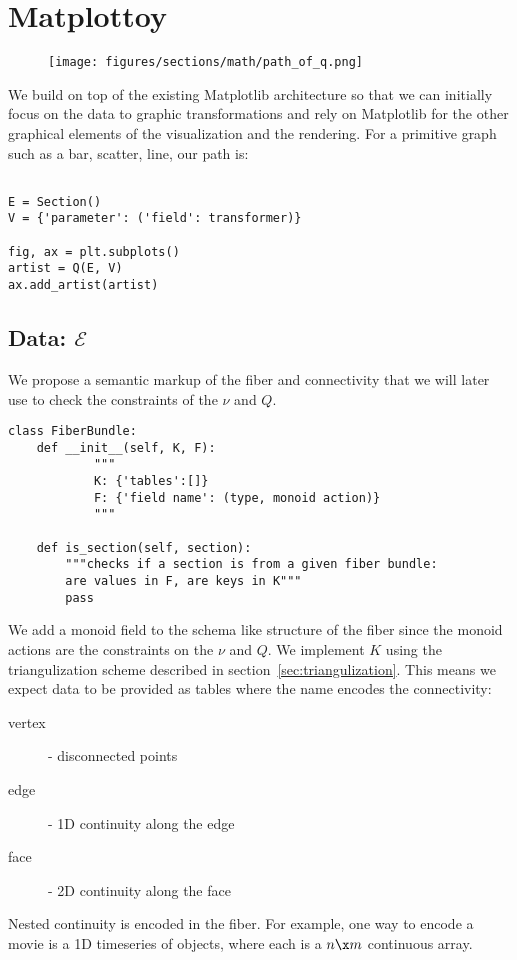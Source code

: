 \documentclass[../main.tex]{subfiles}
\begin{document}
\section{Matplottoy}
\begin{figure}
\texttt{[image: figures/sections/math/path\_of\_q.png]}
\end{figure}

We build on top of the existing Matplotlib architecture \cite{hunterMatplotlib2DGraphics2007} so that we can initially focus on the data to graphic transformations and rely on Matplotlib for the other graphical elements of the visualization and the rendering. For a primitive graph such as a bar, scatter, line, our path is: 
\begin{verbatim}

E = Section()
V = {'parameter': ('field': transformer)}

fig, ax = plt.subplots()
artist = Q(E, V)
ax.add_artist(artist)
\end{verbatim}



\subsection{Data: $\mathcal{E}$}
We propose a semantic markup of the fiber and connectivity that we will later use to check the constraints of the $\nu$ and $Q$. 
\begin{verbatim}
class FiberBundle:
    def __init__(self, K, F):
            """
            K: {'tables':[]}
            F: {'field name': (type, monoid action)}
            """

    def is_section(self, section):
        """checks if a section is from a given fiber bundle:
        are values in F, are keys in K"""
        pass
\end{verbatim}
We add a monoid field to the schema like structure of the fiber since the monoid actions are the constraints on the $\nu$ and $Q$. We implement $K$ using the triangulization scheme described in section~\ref{sec:triangulization}. This means we expect data to be provided as tables where the name encodes the connectivity:

\begin{description}
    \item[vertex] - disconnected points
    \item[edge] - 1D continuity along the edge
    \item[face] - 2D continuity along the face
\end{description}
Nested continuity is encoded in the fiber. For example, one way to encode a movie is a 1D timeseries of  objects, where each  is a $n\x m$ continuous array. 
\end{document}
